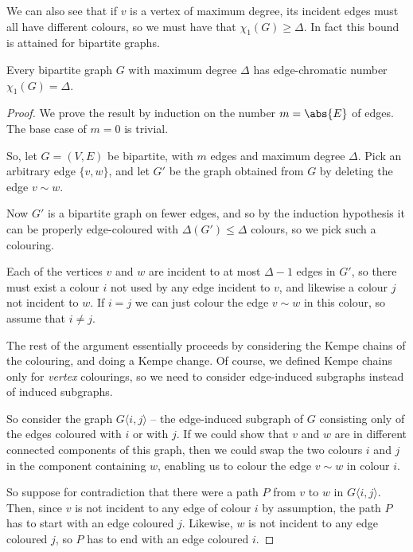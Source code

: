 \documentclass[nobib]{tufte-handout}
\begin{document}
We can also see that if $v$ is a vertex of maximum degree, its incident edges must all have different colours, so we must have that $\chi_1(G) \geq \Delta$. In fact this bound is attained for bipartite graphs.

\begin{theorem}
    Every bipartite graph $G$ with maximum degree $\Delta$ has edge-chromatic number $\chi_1(G) = \Delta$.

    \begin{proof}
        We prove the result by induction on the number $m = \abs{E}$ of edges. The base case of $m = 0$ is trivial.

        So, let $G = (V,E)$ be bipartite, with $m$ edges and maximum degree $\Delta$. Pick an arbitrary edge $\{v,w\}$, and let $G'$ be the graph obtained from $G$ by deleting the edge $v \sim w$.

        Now $G'$ is a bipartite graph on fewer edges, and so by the induction hypothesis it can be properly edge-coloured with $\Delta(G') \leq \Delta$ colours, so we pick such a colouring.

        Each of the vertices $v$ and $w$ are incident to at most $\Delta-1$ edges in $G'$, so there must exist a colour $i$ not used by any edge incident to $v$, and likewise a colour $j$ not incident to $w$. If $i = j$ we can just colour the edge $v \sim w$ in this colour, so assume that $i \neq j$.

        The rest of the argument essentially proceeds by considering the Kempe chains of the colouring, and doing a Kempe change. Of course, we defined Kempe chains only for \emph{vertex} colourings, so we need to consider edge-induced subgraphs instead of induced subgraphs.

        So consider the graph $G\langle i,j\rangle$ -- the edge-induced subgraph of $G$ consisting only of the edges coloured with $i$ or with $j$. If we could show that $v$ and $w$ are in different connected components of this graph, then we could swap the two colours $i$ and $j$ in the component containing $w$, enabling us to colour the edge $v \sim w$ in colour $i$.

        So suppose for contradiction that there were a path $P$ from $v$ to $w$ in $G\langle i,j\rangle$. Then, since $v$ is not incident to any edge of colour $i$ by assumption, the path $P$ has to start with an edge coloured $j$. Likewise, $w$ is not incident to any edge coloured $j$, so $P$ has to end with an edge coloured $i$.


\end{proof}
\end{theorem}
\end{document}
